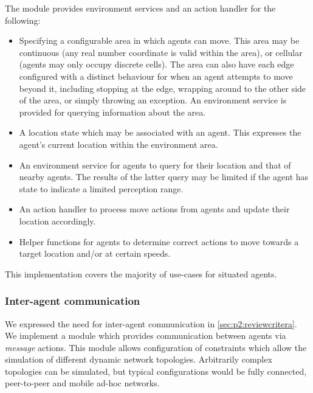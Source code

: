 The module provides environment services and an action handler for the
following:
\begin{itemize}
	\item Specifying a configurable area in which agents can move. This area may be
	continuous (any real number coordinate is valid within the area), or cellular 
	(agents may only occupy discrete cells). The area can also have each edge
	configured with a distinct behaviour for when an agent attempts to move beyond it,
	including stopping at the edge, wrapping around to the other side of the area,
	or simply throwing an exception. An environment service is provided for 
	querying information about the area.
	\item A location state which may be associated with an agent. This expresses
	the agent's current location within the environment area.
	\item An environment service for agents to query for their location and that of
	nearby agents. The results of the latter query may be limited if the agent has
	state to indicate a limited perception range.
	\item An action handler to process move actions from agents and update their
	location accordingly.
	\item Helper functions for agents to determine correct actions to move towards
	a target location and/or at certain speeds.
\end{itemize}

This implementation covers the majority of use-cases for situated agents.

\subsubsection*{Inter-agent communication}

We expressed the need for inter-agent communication in \autoref{sec:p2:reviewcritera}.
We implement a module which provides communication between agents via \emph{
message} actions. This module allows configuration of constraints which allow the
simulation of different dynamic network topologies. Arbitrarily complex
topologies can be simulated, but typical configurations would be fully
connected, peer-to-peer and mobile ad-hoc networks.

